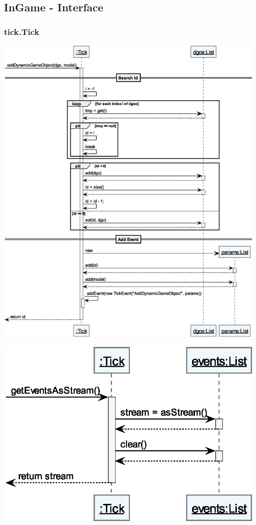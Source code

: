 \subsection{InGame - Interface}

\subsubsection{tick.Tick}

\begin{center}
    \includegraphics[width=\linewidth]{Interface/Tick_addBundle.eps}
\end{center}

\begin{center}
    \centering
    \includegraphics[width=0.5\linewidth]{Interface/Tick_getEventsAsStream.eps}
\end{center}

